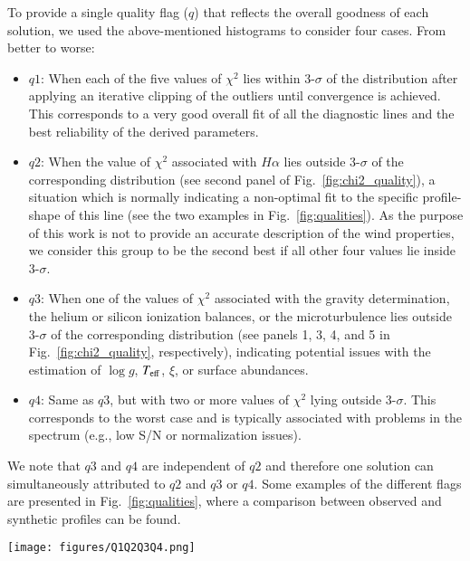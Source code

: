 \documentclass{aa}
\newcommand{\vmic}{$\xi$\xspace}
\newcommand{\Teff}{\mbox{$T_{\rm eff}$}\xspace}
\newcommand{\logg}{\mbox{$\log g$}\xspace}
\begin{document}
To provide a single quality flag ($q$) that reflects the overall goodness of each solution, we used the above-mentioned histograms to consider four cases. From better to worse: 

\begin{itemize}
    \item $q1$: When each of the five values of $\chi^{2}$ lies within 3-$\sigma$ of the distribution after applying an iterative clipping of the outliers until convergence is achieved. This corresponds to a very good overall fit of all the diagnostic lines and the best reliability of the derived parameters. \smallskip
    
    \item $q2$: When the value of $\chi^{2}$ associated with $H\alpha$ lies outside 3-$\sigma$ of the corresponding distribution (see second panel of Fig.~\ref{fig:chi2_quality}), a situation which is normally indicating a non-optimal fit to the specific profile-shape of this line (see the two examples in Fig.~\ref{fig:qualities}).
    As the purpose of this work is not to provide an accurate description of the wind properties, we consider this group to be the second best if all other four values lie inside 3-$\sigma$. \smallskip
    
    \item $q3$: When one of the values of $\chi^{2}$ associated with the gravity determination, the helium or silicon ionization balances, or the microturbulence lies outside 3-$\sigma$ of the corresponding distribution (see panels 1, 3, 4, and 5 in Fig.~\ref{fig:chi2_quality}, respectively), indicating potential issues with the estimation of  \logg, \Teff, \vmic, or surface abundances. \smallskip 
    
    \item $q4$: Same as $q3$, but with two or more values of $\chi^{2}$ lying outside 3-$\sigma$. This corresponds to the worst case and is typically associated with problems in the spectrum (e.g., low S/N or normalization issues).
\end{itemize}

We note that $q3$ and $q4$ are independent of $q2$ and therefore one solution can simultaneously attributed to $q2$ and $q3$ or $q4$. Some examples of the different flags are presented in Fig.~\ref{fig:qualities}, where a comparison between observed and synthetic profiles can be found.

\begin{figure*}[t!]
\centering
\texttt{[image: figures/Q1Q2Q3Q4.png]}
\caption{Four illustrative cases of the quality labels assigned to the solutions (see text). Each row is divided into three spectral windows presenting three of the diagnostic regions: Si~{\sc iii} $\lambda\lambda$4553-68-75\, triplet left; He~{\sc i} $\lambda$4471\, middle; and H$\alpha$, right. The dashed green line is the synthetic spectrum of the model with the best-fitting parameters, with the solid black line being the observed spectrum.}
\label{fig:qualities}
\end{figure*}
\end{document}
